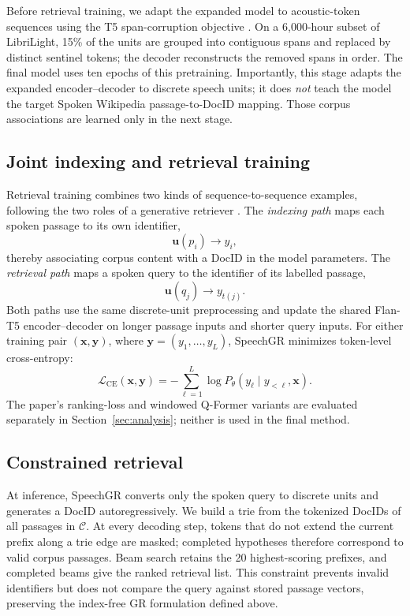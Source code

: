 Before retrieval training, we adapt the expanded model to acoustic-token
sequences using the T5 span-corruption objective
\citep{Raffel2019ExploringTL}.  On a 6,000-hour subset of LibriLight, 15\% of
the units are grouped into contiguous spans and replaced by distinct sentinel
tokens; the decoder reconstructs the removed spans in order.  The final model
uses ten epochs of this pretraining.  Importantly, this stage adapts the
expanded encoder--decoder to discrete speech units; it does
\emph{not} teach the model the target Spoken Wikipedia passage-to-DocID
mapping.  Those corpus associations are learned only in the next stage.

\subsection{Joint indexing and retrieval training}
\label{sec:training}

Retrieval training combines two kinds of sequence-to-sequence examples,
following the two roles of a generative retriever
\citep{Tay2022TransformerMA}.  The \emph{indexing path} maps each spoken
passage to its own identifier,
\[
    \mathbf{u}(p_i)\longrightarrow y_i ,
\]
thereby associating corpus content with a DocID in the model parameters.  The
\emph{retrieval path} maps a spoken query to the identifier of its labelled
passage,
\[
    \mathbf{u}(q_j)\longrightarrow y_{t(j)} .
\]
Both paths use the same discrete-unit preprocessing and update the shared
Flan-T5 encoder--decoder on longer passage inputs and shorter query inputs.
For either training pair
\((\mathbf{x},\mathbf{y})\), where
\(\mathbf{y}=(y_1,\ldots,y_L)\), SpeechGR minimizes token-level
cross-entropy:
\begin{equation}
    \mathcal{L}_{\mathrm{CE}}(\mathbf{x},\mathbf{y})
    =-\sum_{\ell=1}^{L}
    \log P_\theta(y_\ell\mid y_{<\ell},\mathbf{x}) .
    \label{eq:ce}
\end{equation}
The paper's ranking-loss and windowed Q-Former variants are evaluated
separately in Section~\ref{sec:analysis}; neither is used in the final method.

\subsection{Constrained retrieval}
\label{sec:decoding}

At inference, SpeechGR converts only the spoken query to discrete units and
generates a DocID autoregressively.  We build a trie from the tokenized DocIDs
of all passages in \(\mathcal{C}\).  At every decoding step, tokens that do not
extend the current prefix along a trie edge are masked; completed hypotheses
therefore correspond to valid corpus passages.  Beam search retains the 20
highest-scoring prefixes, and completed beams give the ranked retrieval list.
This constraint prevents invalid identifiers but does not compare the query
against stored passage vectors, preserving the index-free GR formulation
defined above.
